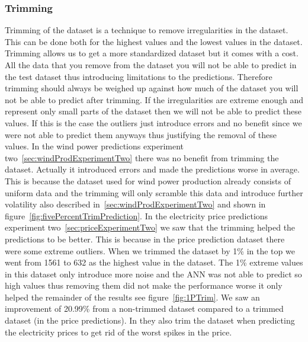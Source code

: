 \subsubsection{Trimming}
Trimming of the dataset is a technique to remove irregularities in the dataset. This can be done both for the highest values and the lowest values in the dataset. Trimming allows us to get a more standardized dataset but it comes with a cost. All the data that you remove from the dataset you will not be able to predict in the test dataset thus introducing limitations to the predictions. Therefore trimming should always be weighed up against how much of the dataset you will not be able to predict after trimming. If the irregularities are extreme enough and represent only small parts of the dataset then we will not be able to predict these values. If this is the case the outliers just introduce errors and no benefit since we were not able to predict them anyways thus justifying the removal of these values. In the wind power predictions experiment two~\ref{sec:windProdExperimentTwo} there was no benefit from trimming the dataset. Actually it introduced errors and made the predictions worse in average. This is because the dataset used for wind power production already consists of uniform data and the trimming will only scramble this data and introduce further volatility also described in~\ref{sec:windProdExperimentTwo} and shown in figure~\ref{fig:fivePercentTrimPrediction}. In the electricity price predictions experiment two~\ref{sec:priceExperimentTwo} we saw that the trimming helped the predictions to be better. This is because in the price prediction dataset there were some extreme outliers. When we trimmed the dataset by 1\% in the top we went from 1561 to 632 as the highest value in the dataset. The 1\% extreme values in this dataset only introduce more noise and the ANN was not able to predict so high values thus removing them did not make the performance worse it only helped the remainder of the results see figure~\ref{fig:1PTrim}. We saw an improvement of 20.99\% from a non-trimmed dataset compared to a trimmed dataset (in the price predictions). In \cite{singhal2011electricity} they also trim the dataset when predicting the electricity prices to get rid of the worst spikes in the price.


